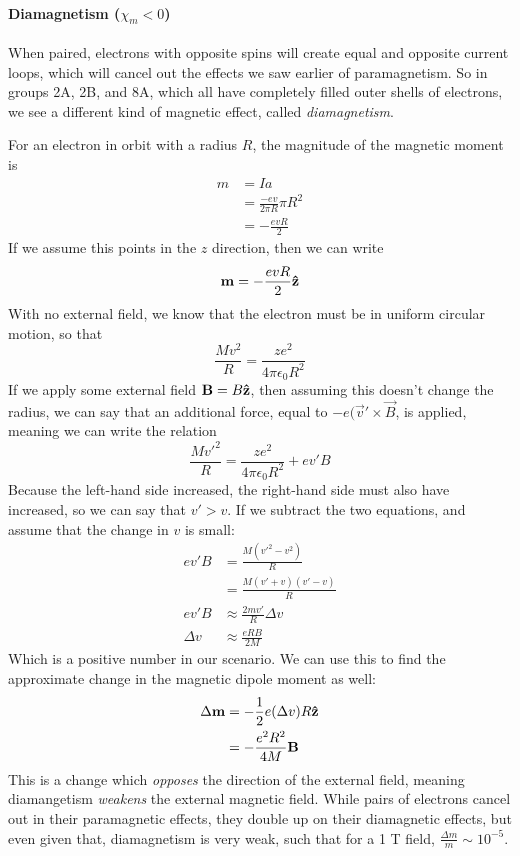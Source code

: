 \documentclass[a4paper]{article}
\begin{document}
\paragraph{Diamagnetism ($\chi_m < 0$)}
When paired, electrons with opposite spins will create equal and opposite
current loops, which will cancel out the effects we saw earlier of
paramagnetism. So in groups 2A, 2B, and 8A, which all have completely filled
outer shells of electrons, we see a different kind of magnetic effect, called
\emph{diamagnetism}.

For an electron in orbit with a radius $R$, the magnitude of the magnetic
moment is
\begin{align*}
	m &= Ia\\
	  &= \frac{-ev}{2\pi R}\pi R^2\\
	  &= -\frac{evR}{2}
\end{align*}
If we assume this points in the $z$ direction, then we can write
\[ \boldsymbol{\mathbf{m}} = -\frac{evR}{2}\boldsymbol{\mathbf{\hat{z}}} \]
With no external field, we know that the electron must be in uniform circular
motion, so that
\[ \frac{Mv^2}{R} = \frac{ze^2}{4\pi\epsilon_0R^2} \]
If we apply some external field $\boldsymbol{\mathbf{B}} = B\boldsymbol{\mathbf{\hat{z}}}$, then assuming this doesn't
change the radius, we can say that an additional force, equal to
$-e(\vec{v}'\times\vec{B}$, is applied, meaning we can write the relation
\[ \frac{Mv'^2}{R} = \frac{ze^2}{4\pi\epsilon_0R^2}+ev'B \]
Because the left-hand side increased, the right-hand side must also have
increased, so we can say that $v'>v$. If we subtract the two equations,
and assume that the change in $v$ is small:
\begin{align*}
	ev'B &= \frac{M(v'^2-v^2)}{R}\\
	     &= \frac{M(v'+v)(v'-v)}{R}\\
	ev'B &\approx \frac{2mv'}{R}\Delta v\\
	\Delta v &\approx \frac{eRB}{2M}
\end{align*}
Which is a positive number in our scenario. We can use this to find the
approximate change in the magnetic dipole moment as well:
\begin{align*}
	\Delta\boldsymbol{\mathbf{m}} &= -\frac{1}{2}e(\Delta v)R\boldsymbol{\mathbf{\hat{z}}}\\
		      &= -\frac{e^2R^2}{4M}\boldsymbol{\mathbf{B}}
\end{align*}
This is a change which \emph{opposes} the direction of the external field,
meaning diamangetism \emph{weakens} the external magnetic field. While pairs
of electrons cancel out in their paramagnetic effects, they double up on their
diamagnetic effects, but even given that, diamagnetism is very weak, such
that for a 1 T field, $\frac{\Delta m}{m} \sim 10^{-5}$.
\end{document}

